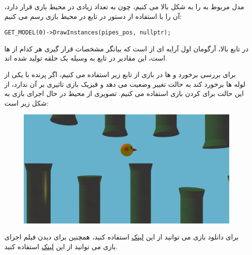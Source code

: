\documentclass[a4paper, 12pt]{book}
\newcommand{\lrit}[1]{\lr{\textit{#1}}}
\begin{document}
    مدل مربوط به  را به شکل بالا  می کنیم، چون  به تعداد زیادی در محیط بازی قرار دارد، آن را با استفاده از دستور در تابع  در محیط بازی رسم می کنیم:
        \begin{LTR}
    \small
        \begin{lstlisting}[style=C++Style,caption=\lrit{draw instances of a model}]
GET_MODEL(0)->DrawInstances(pipes_pos, nullptr);
        \end{lstlisting}
    \end{LTR}
    \normalsize
    \vspace*{0.3cm}
    در تابع بالا، آرگومان اول آرایه ای از  است که بیانگر مشخصات قرار گیری هر کدام از  ها است، این مقادیر در تابع  به وسیله یک حلقه تولید شده اند.\par
    برای بررسی برخورد  و  ها در بازی از تابع زیر استفاده می کنیم، اگر پرنده با یکی از لوله ها برخورد کند به حالت  تغییر وضعیت می دهد و فیزیک بازی تاثیری بر آن ندارد، از این حالت برای  کردن بازی استفاده می کنیم.
    تصویری از محیط در حال اجرای بازی به شکل زیر است:
    \begin{figure}[H]
    \centering
    \href{https://github.com/devprofile98/shm}{
        \includegraphics[width=14cm]{images/flappybird.png}
    }
    \caption{}
    \label{fig:my_label}
\end{figure}
    برای دانلود بازی می توانید از این \href{https://github.com/devprofile98/shm/releases/tag/v0.1-alpha}{لینک} استفاده کنید، همچنین برای دیدن فیلم اجرای بازی می توانید از این \href{https://youtu.be/JqjluAjQV84}{لینک} استفاده کنید.
\end{document}
